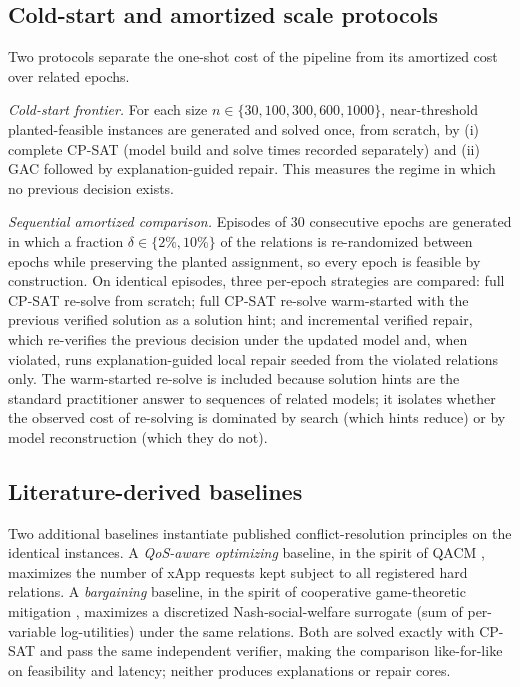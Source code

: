 \documentclass[pdflatex,sn-mathphys-num,iicol,oneside]{sn-jnl}
\begin{document}
\subsection{Cold-start and amortized scale protocols}
\label{sec:amortized-method}

Two protocols separate the one-shot cost of the pipeline from its
amortized cost over related epochs.

\emph{Cold-start frontier.} For each size
$n\in\{30,100,300,600,1000\}$, near-threshold planted-feasible
instances are generated and solved once, from scratch, by (i) complete
CP-SAT (model build and solve times recorded separately) and (ii) GAC
followed by explanation-guided repair. This measures the regime in
which no previous decision exists.

\emph{Sequential amortized comparison.} Episodes of 30 consecutive
epochs are generated in which a fraction
$\delta\in\{2\%,10\%\}$ of the relations is re-randomized between
epochs while preserving the planted assignment, so every epoch is
feasible by construction. On identical episodes, three per-epoch
strategies are compared: full CP-SAT re-solve from scratch; full
CP-SAT re-solve warm-started with the previous verified solution as a
solution hint; and incremental verified repair, which re-verifies the
previous decision under the updated model and, when violated, runs
explanation-guided local repair seeded from the violated relations
only. The warm-started re-solve is included because solution hints are
the standard practitioner answer to sequences of related models; it
isolates whether the observed cost of re-solving is dominated by search
(which hints reduce) or by model reconstruction (which they do not).

\subsection{Literature-derived baselines}

Two additional baselines instantiate published conflict-resolution
principles on the identical instances. A \emph{QoS-aware optimizing}
baseline, in the spirit of QACM \cite{wadud2024qacm}, maximizes the
number of xApp requests kept subject to all registered hard relations.
A \emph{bargaining} baseline, in the spirit of cooperative
game-theoretic mitigation \cite{wadud2023game}, maximizes a discretized
Nash-social-welfare surrogate (sum of per-variable log-utilities) under
the same relations. Both are solved exactly with CP-SAT and pass the
same independent verifier, making the comparison like-for-like on
feasibility and latency; neither produces explanations or repair
cores.
\end{document}
